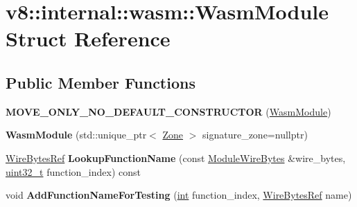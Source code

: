 \hypertarget{structv8_1_1internal_1_1wasm_1_1WasmModule}{}\section{v8\+:\+:internal\+:\+:wasm\+:\+:Wasm\+Module Struct Reference}
\label{structv8_1_1internal_1_1wasm_1_1WasmModule}
\subsection*{Public Member Functions}
\begin{DoxyCompactItemize}
\item 
\mbox{\label{structv8_1_1internal_1_1wasm_1_1WasmModule_a9ab1665f3fa89d4a382756f3224c333c}} 
{\bfseries M\+O\+V\+E\+\_\+\+O\+N\+L\+Y\+\_\+\+N\+O\+\_\+\+D\+E\+F\+A\+U\+L\+T\+\_\+\+C\+O\+N\+S\+T\+R\+U\+C\+T\+OR} (\mbox{\hyperlink{structv8_1_1internal_1_1wasm_1_1WasmModule}{Wasm\+Module}})
\item 
\mbox{\label{structv8_1_1internal_1_1wasm_1_1WasmModule_af1b5cc2684dbc70512ab7dc467b696f7}} 
{\bfseries Wasm\+Module} (std\+::unique\+\_\+ptr$<$ \mbox{\hyperlink{classv8_1_1internal_1_1Zone}{Zone}} $>$ signature\+\_\+zone=nullptr)
\item 
\mbox{\label{structv8_1_1internal_1_1wasm_1_1WasmModule_a568f53d30d3aa8efadd709266917e07c}} 
\mbox{\hyperlink{classv8_1_1internal_1_1wasm_1_1WireBytesRef}{Wire\+Bytes\+Ref}} {\bfseries Lookup\+Function\+Name} (const \mbox{\hyperlink{structv8_1_1internal_1_1wasm_1_1ModuleWireBytes}{Module\+Wire\+Bytes}} \&wire\+\_\+bytes, \mbox{\hyperlink{classuint32__t}{uint32\+\_\+t}} function\+\_\+index) const
\item 
\mbox{\label{structv8_1_1internal_1_1wasm_1_1WasmModule_a9ec62974bccd1c2588ac61f3f32daef1}} 
void {\bfseries Add\+Function\+Name\+For\+Testing} (\mbox{\hyperlink{classint}{int}} function\+\_\+index, \mbox{\hyperlink{classv8_1_1internal_1_1wasm_1_1WireBytesRef}{Wire\+Bytes\+Ref}} name)
\end{DoxyCompactItemize}

